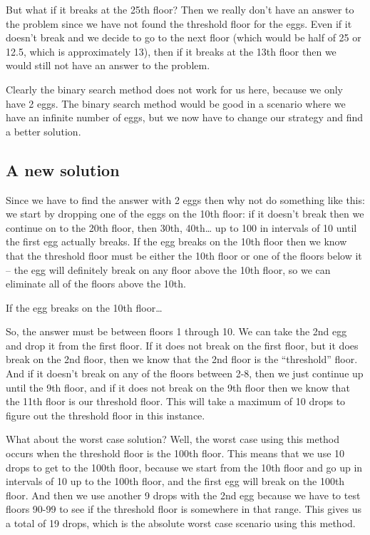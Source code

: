 \documentclass[]{article}
\begin{document}
But what if it breaks at the 25th floor? Then we really don’t have an answer to the problem since we have not found the threshold floor for the eggs. Even if it doesn’t break and we decide to go to the next floor (which would be half of 25 or 12.5, which is approximately 13), then if it breaks at the 13th floor then we would still not have an answer to the problem.

Clearly the binary search method does not work for us here, because we only have 2 eggs. The binary search method would be good in a scenario where we have an infinite number of eggs, but we now have to change our strategy and find a better solution.

\subsection{A new solution}

Since we have to find the answer with 2 eggs then why not do something like this: we start by dropping one of the eggs on the 10th floor: if it doesn’t break then we continue on to the 20th floor, then 30th, 40th… up to 100 in intervals of 10 until the first egg actually breaks. If the egg breaks on the 10th floor then we know that the threshold floor must be either the 10th floor or one of the floors below it – the egg will definitely break on any floor above the 10th floor, so we can eliminate all of the floors above the 10th.

If the egg breaks on the 10th floor…

So, the answer must be between floors 1 through 10. We can take the 2nd egg and drop it from the first floor. If it does not break on the first floor, but it does break on the 2nd floor, then we know that the 2nd floor is the “threshold” floor. And if it doesn’t break on any of the floors between 2-8, then we just continue up until the 9th floor, and if it does not break on the 9th floor then we know that the 11th floor is our threshold floor. This will take a maximum of 10 drops to figure out the threshold floor in this instance.

What about the worst case solution? Well, the worst case using this method occurs when the threshold floor is the 100th floor. This means that we use 10 drops to get to the 100th floor, because we start from the 10th floor and go up in intervals of 10 up to the 100th floor, and the first egg will break on the 100th floor. And then we use another 9 drops with the 2nd egg because we have to test floors 90-99 to see if the threshold floor is somewhere in that range. This gives us a total of 19 drops, which is the absolute worst case scenario using this method.
\end{document}
